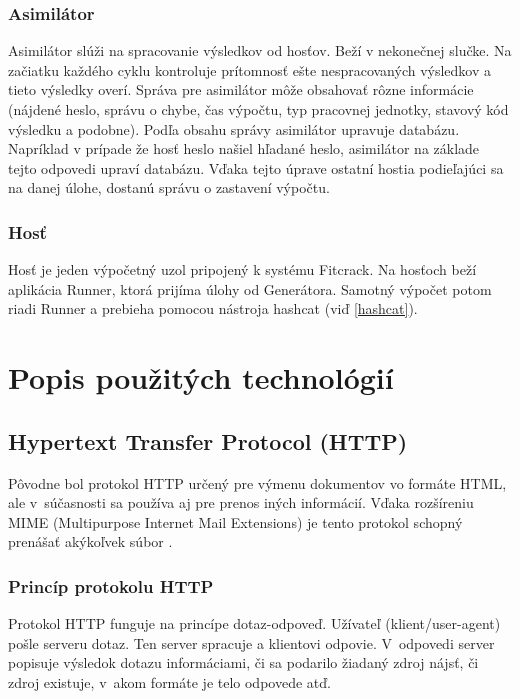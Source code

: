 \documentclass[slovak]{fitthesis}
\begin{document}
\subsection{Asimilátor}
\label{asimilator}
Asimilátor slúži na spracovanie výsledkov od hosťov. Beží v nekonečnej slučke. Na začiatku každého cyklu kontroluje prítomnosť ešte nespracovaných výsledkov a tieto výsledky overí. Správa pre asimilátor môže obsahovať rôzne informácie (nájdené heslo, správu o chybe, čas výpočtu, typ pracovnej jednotky, stavový kód výsledku a podobne). Podľa obsahu správy asimilátor upravuje databázu. Napríklad v prípade že hosť heslo našiel hľadané heslo, asimilátor na základe tejto odpovedi upraví databázu. Vďaka tejto úprave ostatní hostia podieľajúci sa na danej úlohe, dostanú správu o zastavení výpočtu.

\subsection{Hosť}
Hosť je jeden výpočetný uzol pripojený k systému Fitcrack. Na hosťoch beží aplikácia Runner, ktorá prijíma úlohy od Generátora. Samotný výpočet potom riadi Runner a prebieha pomocou nástroja hashcat (viď \ref{hashcat}).






\chapter{Popis použitých technológií}\label{technologie}


\section{Hypertext Transfer Protocol (HTTP)}\label{http}
Pôvodne bol protokol HTTP určený pre výmenu dokumentov vo formáte HTML, ale v~súčasnosti sa používa aj pre prenos iných informácií. Vďaka rozšíreniu MIME (Multipurpose Internet Mail Extensions) je tento protokol schopný prenášať akýkoľvek súbor \cite{httpRFC}.

\subsection{Princíp protokolu HTTP}
Protokol HTTP funguje na princípe dotaz-odpoveď. Užívateľ (klient/user-agent) pošle serveru dotaz. Ten server spracuje a klientovi odpovie. V~odpovedi server popisuje výsledok dotazu informáciami, či sa podarilo žiadaný zdroj nájsť, či zdroj existuje, v~akom formáte je telo odpovede atď.
\end{document}
